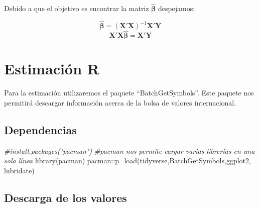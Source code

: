 \documentclass[
]{book}
\newenvironment{Shaded}{\begin{snugshade}}{\end{snugshade}}
\newcommand{\CommentTok}[1]{\textcolor[rgb]{0.56,0.35,0.01}{\textit{#1}}}
\newcommand{\FunctionTok}[1]{\textcolor[rgb]{0.00,0.00,0.00}{#1}}
\newcommand{\NormalTok}[1]{#1}
\newcommand{\SpecialCharTok}[1]{\textcolor[rgb]{0.00,0.00,0.00}{#1}}
\begin{document}
Debido a que el objetivo es encontrar la matriz \(\hat{\boldsymbol\beta}\) despejamos:

\[\hat{\boldsymbol \beta} = (\mathbf{X'X})^{-1}\mathbf{X'Y}
\]
\[
    \mathbf{X'X}\hat{\boldsymbol \beta} = \mathbf{X'Y}
\]

\hypertarget{estimaciuxf3n-r}{%
\section{Estimación R}\label{estimaciuxf3n-r}}

Para la estimación utilizaremos el paquete ``BatchGetSymbols''. Este paquete nos permitirá descargar información acerca de la bolsa de valores internacional.

\hypertarget{dependencias}{%
\subsection{Dependencias}\label{dependencias}}

\begin{Shaded}
\begin{Highlighting}[]
\CommentTok{\#install.packages("pacman")}
\CommentTok{\#pacman nos permite cargar varias librerias en una sola línea}
\FunctionTok{library}\NormalTok{(pacman)}
\NormalTok{pacman}\SpecialCharTok{::}\FunctionTok{p\_load}\NormalTok{(tidyverse,BatchGetSymbols,ggplot2, lubridate)}
\end{Highlighting}
\end{Shaded}

\hypertarget{descarga-de-los-valores}{%
\subsection{Descarga de los valores}\label{descarga-de-los-valores}}
\end{document}
